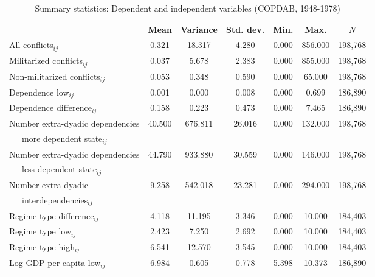 \begin{table}[htbp]\centering\scriptsize
\caption{Summary statistics: Dependent and independent variables (COPDAB, 1948-1978) \label{tab2:summarystatsallvarcopdab}}
\def\sym#1{\ifmmode^{#1}\else\(^{#1}\)\fi}
\begin{tabular}{l*{1}{cccccc}}
\toprule
            &        Mean&         Variance&          Std. dev.&         Min.&         Max.&       $N$\\
\midrule
All conflicts$_{ij}$&       0.321&      18.317&       4.280&       0.000&     856.000&      198,768\\
Militarized conflicts$_{ij}$&       0.037&       5.678&       2.383&       0.000&     855.000&      198,768\\
Non-militarized conflicts$_{ij}$&       0.053&       0.348&       0.590&       0.000&      65.000&      198,768\\
Dependence low$_{ij}$  &       0.001&       0.000&       0.008&       0.000&       0.699&      186,890\\
Dependence difference$_{ij}$&       0.158&       0.223&       0.473&       0.000&       7.465&      186,890\\
Number extra-dyadic dependencies&      40.500&     676.811&      26.016&       0.000&     132.000&      198,768\\
~~~more dependent state$_{ij}$&           &          &         &          &           &         \\
Number extra-dyadic dependencies&      44.790&     933.880&      30.559&       0.000&     146.000&      198,768\\
~~~less dependent state$_{ij}$&       &       &        &        &        &         \\
Number extra-dyadic&       9.258&     542.018&      23.281&       0.000&     294.000&      198,768\\
~~~interdependencies$_{ij}$&        &       &        &        &       &       \\
Regime type difference$_{ij}$     &       4.118&      11.195&       3.346&       0.000&      10.000&      184,403\\
Regime type low$_{ij}$       &       2.423&       7.250&       2.692&       0.000&      10.000&      184,403\\
Regime type high$_{ij}$       &       6.541&      12.570&       3.545&       0.000&      10.000&      184,403\\
Log GDP per capita low$_{ij}$ &       6.984&       0.605&       0.778&       5.398&      10.373&      186,890\\

\end{tabular}
\end{table}
